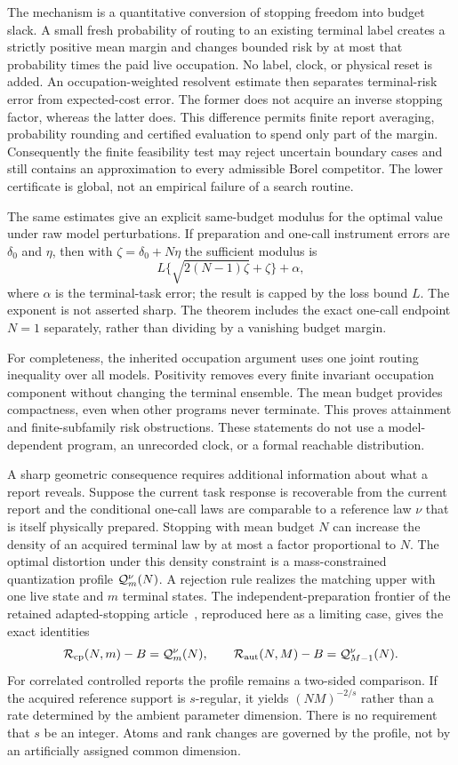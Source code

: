 The mechanism is a quantitative conversion of stopping freedom into budget slack. A small fresh probability of routing to an existing terminal label creates a strictly positive mean margin and changes bounded risk by at most that probability times the paid live occupation. No label, clock, or physical reset is added. An occupation-weighted resolvent estimate then separates terminal-risk error from expected-cost error. The former does not acquire an inverse stopping factor, whereas the latter does. This difference permits finite report averaging, probability rounding and certified evaluation to spend only part of the margin. Consequently the finite feasibility test may reject uncertain boundary cases and still contains an approximation to every admissible Borel competitor. The lower certificate is global, not an empirical failure of a search routine.

The same estimates give an explicit same-budget modulus for the optimal value under raw model perturbations. If preparation and one-call instrument errors are $\delta_0$ and $\eta$, then with $\zeta=\delta_0+N\eta$ the sufficient modulus is
\[
 L\{\sqrt{2(N-1)\zeta}+\zeta\}+\alpha,
\]
where $\alpha$ is the terminal-task error; the result is capped by the loss bound $L$. The exponent is not asserted sharp. The theorem includes the exact one-call endpoint $N=1$ separately, rather than dividing by a vanishing budget margin.

For completeness, the inherited occupation argument uses one joint routing inequality over all models. Positivity removes every finite invariant occupation component without changing the terminal ensemble. The mean budget provides compactness, even when other programs never terminate. This proves attainment and finite-subfamily risk obstructions. These statements do not use a model-dependent program, an unrecorded clock, or a formal reachable distribution.

A sharp geometric consequence requires additional information about what a report reveals. Suppose the current task response is recoverable from the current report and the conditional one-call laws are comparable to a reference law $\nu$ that is itself physically prepared. Stopping with mean budget $N$ can increase the density of an acquired terminal law by at most a factor proportional to $N$. The optimal distortion under this density constraint is a mass-constrained quantization profile $\mathcal Q_m^\nu(N)$. A rejection rule realizes the matching upper with one live state and $m$ terminal states. The independent-preparation frontier of the retained adapted-stopping article~\cite{GTFStopped}, reproduced here as a limiting case, gives the exact identities
\begin{equation}\label{eq:intro-exact}
 \mathcal R_{\mathrm{cp}}(N,m)-B=\mathcal Q_m^\nu(N),\qquad
 \mathcal R_{\mathrm{aut}}(N,M)-B=\mathcal Q_{M-1}^\nu(N).
\end{equation}
For correlated controlled reports the profile remains a two-sided comparison. If the acquired reference support is $s$-regular, it yields $(NM)^{-2/s}$ rather than a rate determined by the ambient parameter dimension. There is no requirement that $s$ be an integer. Atoms and rank changes are governed by the profile, not by an artificially assigned common dimension.

